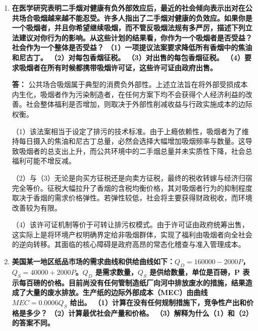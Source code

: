 \begin{enumerate}[label=\textbf{\arabic*.}, leftmargin=*]
		（2）规定同样的排污标准属于典型的一刀切式数量管制手段。
		当四家厂商的减污技术存在显著代数差异，即边际减污成本曲线不重合时，强行施加均等的实物标准将剥夺低成本企业的治理优势。
		这不仅无法达成社会总减污成本的最小化，还会由于缺乏多减排的超额利润激励，导致各厂商完全失去引入升级版过滤设备的研发动力。
		
		（3）可转让废水许可证制度则是将标准的总量锁定优势与排污费的成本分配效率完美兼顾的集大成机制。
		地区组织只需率先核定该河流生态所能承受的废水总容量，并在初期将许可证均等分发给四家厂商。
		许可证在二级市场的自由买卖将迅速催生出有效的权利均衡价格。
		低治理成本的厂商会通过加速过滤并出让盈余许可证来变现，高成本厂商则会通过买入许可证来对冲惩罚。
		该机制既确保了环境总质量绝对不超标，又成功利用市场看不见的手将减污负担自发配置给效率最高的企业。
		
		\item \textbf{在医学研究表明二手烟对健康有负外部效应后，最近的社会倾向表示出对在公共场合吸烟越来越不能忍受。许多人指出了二手烟对健康的负效应。如果你是一个吸烟者，并且你希望继续吸烟，而不管反吸烟法规有多严厉，描述下列立法建议对你行为的影响。从这些计划的结果看，你作为一个吸烟者是否受益？社会作为一个整体是否受益？
			（1）一项提议法案要求降低所有香烟中的焦油和尼古丁。
			（2）对每包香烟征税。
			（3）对出售的每包香烟征税。
			（4）要求吸烟者在所有时候都携带吸烟许可证，这些许可证由政府出售。}
		
		\textbf{答：} 公共场合吸烟属于典型的消费负外部性。上述立法旨在将外部受损成本内生化，吸烟者作为污染制造者，在任何方案下均不会获得个人经济利益的改善。社会整体福利是否增加，则取决于外部性削减收益与行政实施成本的边际权衡。
		
		（1）该法案相当于设定了排污的技术标准。由于上瘾依赖性，吸烟者为了维持每日摄入的焦油和尼古丁总量，必然会选择大幅增加吸烟频率与数量。这导致吸烟者的总支出上升，而公共环境中的二手烟总量并未实质性下降，社会总福利可能不增反减。
		
		（2）与（3）无论是向买方征税还是向卖方征税，最终的税收转嫁与经济归宿完全等价。征税大幅拉升了香烟的含税均衡价格，其对吸烟者行为的抑制程度取决于香烟的需求价格弹性。若弹性较低，社会将主要获得财政税收，而环境改善较为有限。
		
		（4）该许可证机制等价于可转让排污权模式。由于许可证由政府统筹出售，这实际上是将环境产权明确界定给非吸烟群体，实现了福利由吸烟者向全社会的逆向转移。其面临的核心障碍是政府高昂的常态化稽查与准入管理成本。
		
		\item \textbf{美国某一地区纸品市场的需求曲线和供给曲线如下：$Q_D = 160000 - 2000P$，$Q_S = 40000 + 2000P$。$Q_D$ 是需求数量，$Q_S$ 是供给数量，单位是百磅，P 表示每百磅的价格。目前尚没有任何管制造纸厂向河中排放废水的措施，结果造成了大量的废水排放。生产纸的边际外部成本（MEC）由曲线 $MEC = 0.0006Q_S$ 给出。
			（1）计算在没有任何规制措施下，竞争性产出和价格是多少？
			（2）计算最优社会产量和价格。
			（3）解释为什么（1）和（2）的答案不同。}
		

\end{enumerate}
